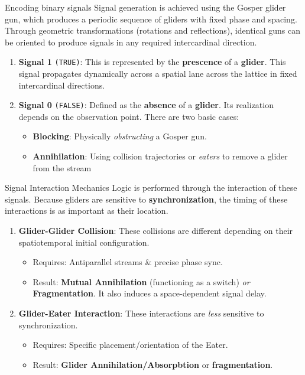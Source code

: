 \begin{definitionbox}[label=signalencoding]{Encoding binary signals}
Signal generation is achieved using the Gosper glider gun, which produces a periodic sequence of gliders with fixed phase and spacing. Through geometric transformations (rotations and reflections), identical guns can be oriented to produce signals in any required intercardinal direction.
\begin{enumerate}
\item \textbf{Signal 1} \texttt{(TRUE)}: This is represented by the \textbf{prescence} of a \textbf{glider}. This
signal propagates dynamically across a spatial lane across the lattice in fixed intercardinal directions.
\item \textbf{Signal 0} \texttt{(FALSE)}: Defined as the \textbf{absence} of a \textbf{glider}.  Its realization
depends on the observation point. There are two basic cases:
    \begin{itemize}
    \item \textbf{Blocking}: Physically \textit{obstructing} a Gosper gun.
    \item \textbf{Annihilation}: Using collision trajectories or \textit{eaters} to remove a glider from the stream
    \end{itemize}
\end{enumerate}
\end{definitionbox}
\begin{definitionbox}[label=sigintmech]{Signal Interaction Mechanics}
Logic is performed through the interaction of these signals. Because gliders are sensitive to
\textbf{synchronization}, the timing of these interactions is as important as their location.

\begin{enumerate}
\item \textbf{Glider-Glider Collision}: These collisions are different depending on their spatiotemporal initial
configuration.
    \begin{itemize}
    \item Requires: Antiparallel streams \& precise phase sync.
    \item Result: \textbf{Mutual Annihilation} (functioning as a switch) \textit{or} \textbf{Fragmentation}. It also
    induces a space-dependent signal delay.
    \end{itemize}
    \item \textbf{Glider-Eater Interaction}: These interactions are \textit{less} sensitive to synchronization.
    \begin{itemize}
    \item Requires: Specific placement/orientation of the Eater.
    \item Result: \textbf{Glider Annihilation/Absorpbtion} or \textbf{fragmentation}.
    \end{itemize}
\end{enumerate}
\end{definitionbox}

